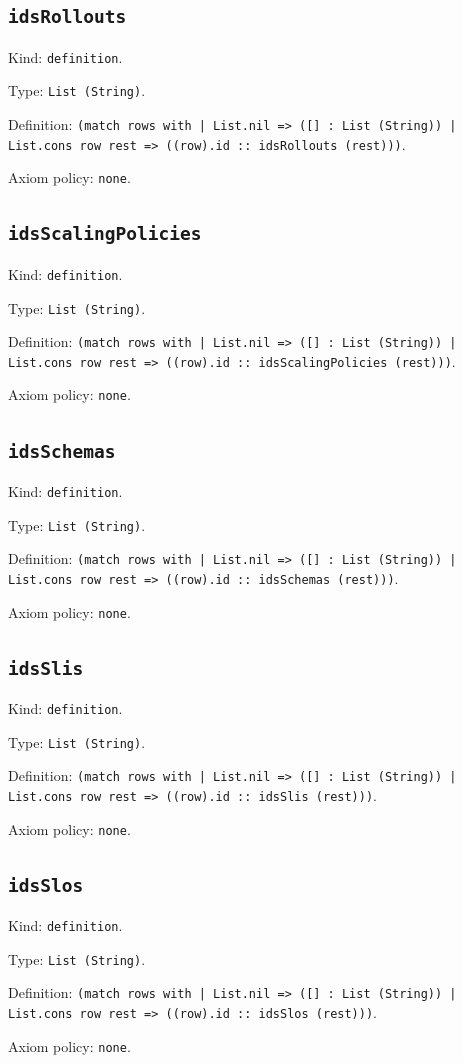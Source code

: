 \documentclass[11pt]{article}
\begin{document}
\subsection*{\texttt{idsRollouts}}
\noindent Kind: \texttt{definition}.\par
\noindent Type: \texttt{List (String)}.\par
\noindent Definition: \texttt{(match rows with | List.nil => ([] : List (String)) | List.cons row rest => ((row).id :: idsRollouts (rest)))}.\par
\noindent Axiom policy: \texttt{none}.\par
\subsection*{\texttt{idsScalingPolicies}}
\noindent Kind: \texttt{definition}.\par
\noindent Type: \texttt{List (String)}.\par
\noindent Definition: \texttt{(match rows with | List.nil => ([] : List (String)) | List.cons row rest => ((row).id :: idsScalingPolicies (rest)))}.\par
\noindent Axiom policy: \texttt{none}.\par
\subsection*{\texttt{idsSchemas}}
\noindent Kind: \texttt{definition}.\par
\noindent Type: \texttt{List (String)}.\par
\noindent Definition: \texttt{(match rows with | List.nil => ([] : List (String)) | List.cons row rest => ((row).id :: idsSchemas (rest)))}.\par
\noindent Axiom policy: \texttt{none}.\par
\subsection*{\texttt{idsSlis}}
\noindent Kind: \texttt{definition}.\par
\noindent Type: \texttt{List (String)}.\par
\noindent Definition: \texttt{(match rows with | List.nil => ([] : List (String)) | List.cons row rest => ((row).id :: idsSlis (rest)))}.\par
\noindent Axiom policy: \texttt{none}.\par
\subsection*{\texttt{idsSlos}}
\noindent Kind: \texttt{definition}.\par
\noindent Type: \texttt{List (String)}.\par
\noindent Definition: \texttt{(match rows with | List.nil => ([] : List (String)) | List.cons row rest => ((row).id :: idsSlos (rest)))}.\par
\noindent Axiom policy: \texttt{none}.\par
\end{document}
